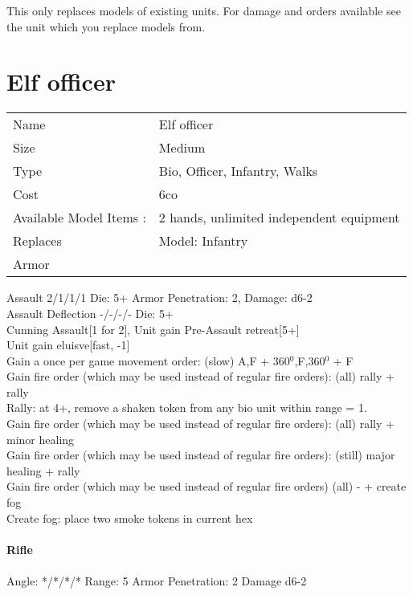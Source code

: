 This only replaces models of existing units. For damage and orders available see the unit which you replace models from.



\pagebreak

\section{ Elf officer }

\begin{tabular}{ll}
  Name & Elf officer \\
  Size & Medium\\
  Type & Bio, Officer, Infantry, Walks\\
  Cost & 6co\\
  Available Model Items : &2 hands, unlimited independent equipment\\
  Replaces & Model: Infantry\\
  Armor & 
\end{tabular}



Assault 2/1/1/1 Die: 5+ Armor Penetration: 2, Damage: d6-2 \\
Assault Deflection -/-/-/- Die: 5+\\
Cunning Assault[1 for 2], Unit gain Pre-Assault retreat[5+]
\ \\

Unit gain eluisve[fast, -1] \\ Gain a once per game movement order: (slow) A,F + 360$^0$,F,360$^0$ + F \\ Gain fire order (which may be used instead of regular fire orders): (all) rally + rally\\ Rally: at 4+, remove a shaken token from any bio unit within range = 1. \\ Gain fire order (which may be used instead of regular fire orders): (all) rally + minor healing \\ Gain fire order (which may be used instead of regular fire orders): (still) major healing + rally\\ Gain fire order (which may be used instead of regular fire orders) (all) - + create fog\\ Create fog: place two smoke tokens in current hex\\

\ \\
{\bf Rifle } \\
\ \\
Angle: */*/*/* Range: 5 Armor Penetration: 2 Damage d6-2 \\
\indent  \\





